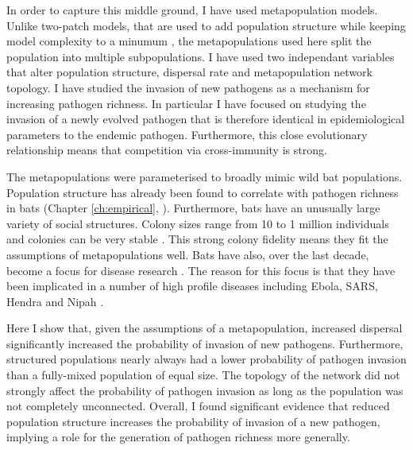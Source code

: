 
In order to capture this middle ground, I have used metapopulation models. 
Unlike two-patch models, that are used to add population structure while keeping model complexity to a minumum \cite{qiu2013vector, allen2004sis, garmer2016multistrain}, the metapopulations used here split the population into multiple subpopulations.
I have used two independant variables that alter population structure, dispersal rate and metapopulation network topology.
I have studied the invasion of new pathogens as a mechanism for increasing pathogen richness.
In particular I have focused on studying the invasion of a newly evolved pathogen that is therefore identical in epidemiological parameters to the endemic pathogen.
Furthermore, this close evolutionary relationship means that competition via cross-immunity is strong.

The metapopulations were parameterised to broadly mimic wild bat populations.
Population structure has already been found to correlate with pathogen richness in bats (Chapter \ref{ch:empirical}, \cites{gay2014parasite, maganga2014bat, turmelle2009correlates}).
Furthermore, bats have an unusually large variety of social structures.
Colony sizes range from 10 to 1 million \cite{jones2009pantheria} individuals and colonies can be very stable \cite{kerth2011bats, mccracken1981social}.
This strong colony fidelity means they fit the assumptions of metapopulations well.
Bats have also, over the last decade, become a focus for disease research \cite{calisher2006bats, hughes2007emerging}.
The reason for this focus is that they have been implicated in a number of high profile diseases including Ebola, SARS, Hendra and Nipah \cite{calisher2006bats, li2005bats}.



Here I show that, given the assumptions of a metapopulation, increased dispersal significantly increased the probability of invasion of new pathogens.
Furthermore, structured populations nearly always had a lower probability of pathogen invasion than a fully-mixed population of equal size.
The topology of the network did not strongly affect the probability of pathogen invasion as long as the population was not completely unconnected.
Overall, I found significant evidence that reduced population structure increases the probability of invasion of a new pathogen, implying a role for the generation of pathogen richness more generally.


